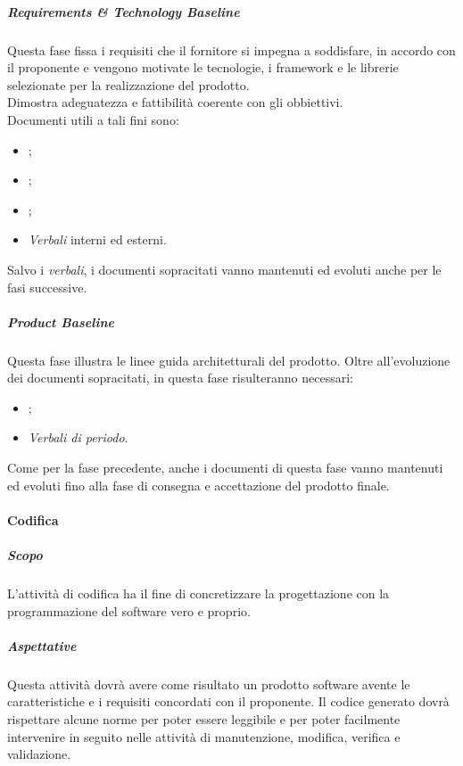 \subparagraph{Requirements \& Technology Baseline} \label{subparagraph:Requirements & technology baseline}
Questa fase fissa i requisiti che il fornitore si impegna a soddisfare, in accordo con il proponente e vengono motivate le tecnologie,
i framework\glo{} e le librerie selezionate per la realizzazione del prodotto.\\
Dimostra adeguatezza e fattibilità coerente con gli obbiettivi.\\
Documenti utili a tali fini sono:
\begin{itemize}
    \item \docNamePdP{};
    \item \docNamePdQ{};
    \item \docNameNdP{};
    \item \textit{Verbali} interni ed esterni.
\end{itemize}
Salvo i \textit{verbali}, i documenti sopracitati vanno mantenuti ed evoluti anche per le fasi successive.\\


\subparagraph{Product Baseline} \label{subparagraph:Product_baseline}
Questa fase illustra le linee guida architetturali del prodotto.
Oltre all'evoluzione dei documenti sopracitati, in questa fase risulteranno necessari:
\begin{itemize}
    \item \docNameMU{};
    \item \textit{Verbali di periodo}.
\end{itemize}
Come per la fase precedente, anche i documenti di questa fase vanno mantenuti ed evoluti fino alla fase di consegna e accettazione del prodotto finale.

\paragraph{Codifica}    \label{paragraph:Codifica}
\subparagraph{Scopo}    \label{subparagraph:Codifica_Scopo}
L'attività di codifica ha il fine di concretizzare la progettazione con la programmazione del software vero e proprio.

\subparagraph{Aspettative}    \label{subparagraph:Codifica_Aspettative}
Questa attività dovrà avere come risultato un prodotto software avente le caratteristiche e i requisiti concordati con il proponente. Il codice generato dovrà
rispettare alcune norme per poter essere leggibile e per poter facilmente intervenire in seguito nelle attività di manutenzione, modifica, verifica e validazione.

